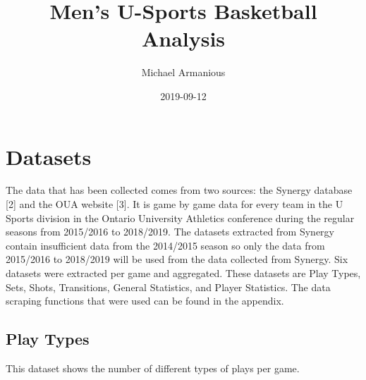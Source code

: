 \documentclass[]{book}
\title{Men's U-Sports Basketball Analysis}
\author{Michael Armanious}
\date{2019-09-12}
\begin{document}
\maketitle

{
\setcounter{tocdepth}{1}
\tableofcontents
}
\hypertarget{datasets}{%
\chapter{Datasets}\label{datasets}}

The data that has been collected comes from two sources: the Synergy database {[}2{]} and the OUA website {[}3{]}. It is game by game data for every team in the U Sports division in the Ontario University Athletics conference during the regular seasons from 2015/2016 to 2018/2019. The datasets extracted from Synergy contain insufficient data from the 2014/2015 season so only the data from 2015/2016 to 2018/2019 will be used from the data collected from Synergy. Six datasets were extracted per game and aggregated. These datasets are Play Types, Sets, Shots, Transitions, General Statistics, and Player Statistics. The data scraping functions that were used can be found in the appendix.

\hypertarget{play-types}{%
\section{Play Types}\label{play-types}}

This dataset shows the number of different types of plays per game.
\end{document}
